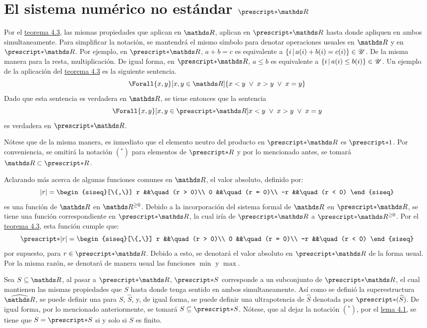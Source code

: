 \section{El sistema numérico no estándar \texorpdfstring{$\st{\R}$}{R}}

Por el \hyperref[theo:FT]{teorema 4.3}, las mismas propiedades que aplican
en $\R$, aplican en $\st{\R}$ hasta donde apliquen en ambos simultaneamente.
Para simplificar la notación, se mantendrá el mismo símbolo para
denotar operaciones usuales en $\R$ y en $\st{\R}$.
Por ejemplo, en $\st{\R}$, $a + b = c$ es equivalente a
$\left\{i\,\middle|\,a(i) + b(i) = c(i)\right\}\in\mathscr{U}$. De la misma manera para la
resta, multiplicación. De igual forma, en $\st{\R}$, $a \leq b$ es
equivalente a $\left\{i\,\middle|\,a(i)\leq b(i)\right\}\in\mathscr{U}$. Un ejemplo de la
aplicación del \hyperref[theo:FT]{teorema 4.3} es la siguiente sentencia.
\[\Forall{x,y}[x,y\in\R]{x<y \;\lor\; x>y \;\lor\; x=y}\]
Dado que esta sentencia es verdadera en $\R$, se tiene entonces que la
sentencia
\[\Forall{x,y}[x,y\in\st{\R}]{x<y \;\lor\; x>y \;\lor\; x=y}\]
es verdadera en $\st{\R}$.

Nótese que de la misma manera, es inmediato que el elemento neutro del
producto en $\st{\R}$ es $\st{1}$. Por conveniencia, se omitirá la notación
$({^*})$ para elementos de $\st{R}$ y por lo mencionado antes,
se tomará $\R \subset \st{R}$.

Aclarando más acerca de algunas funciones comunes en $\R$, el valor
absoluto, definido por:
\[
  |r| =
  \begin{siseq}[\{,\}]
    r   &&\quad (r > 0)\\
    0   &&\quad (r = 0)\\
    -r  &&\quad (r < 0)
  \end{siseq}
\]
es una función de $\R$ en $\R^{\geq 0}$. Debido a la incorporación
del sistema formal de $\R$ en $\st{\R}$, se tiene una función
correspondiente en $\st{\R}$, la cual iría de $\st{\R}$ a
$\st{\R^{\geq 0}}$. Por el \hyperref[theo:FT]{teorema 4.3}, esta función
cumple que:
\[
  \st{|r|} =
  \begin{siseq}[\{,\}]
    r   &&\quad (r > 0)\\
    0   &&\quad (r = 0)\\
    -r  &&\quad (r < 0)
  \end{siseq}
\]
por supuesto, para $r\in\st{\R}$. Debido a esto, se denotará el valor
absoluto en $\st{\R}$ de la forma usual. Por la misma razón, se denotará
de manera usual las funciones $\min$ y $\max$.

Sea $S\subseteq\R$, al pasar a $\st{\R}$, $\st{S}$ corresponde a un
subconjunto de $\st{\R}$, el cual mantienen las mismas propiedades que $S$
hasta donde tenga sentido en ambos simultaneamente. Así como se definió
la superestructura $\Rh$, se puede definir una para $S$, $\widehat{S}$, y,
de igual forma, se puede definir una ultrapotencia de $\widehat{S}$ denotada
por $\st{(\widehat{S})}$. De igual forma, por lo mencionado anteriormente,
se tomará $S\subseteq\st{S}$. Nótese, que al dejar la notación $({^*})$,
por el \hyperref[lema:stR]{lema 4.1}, se tiene que $S=\st{S}$ si y solo
si $S$ es finito.

